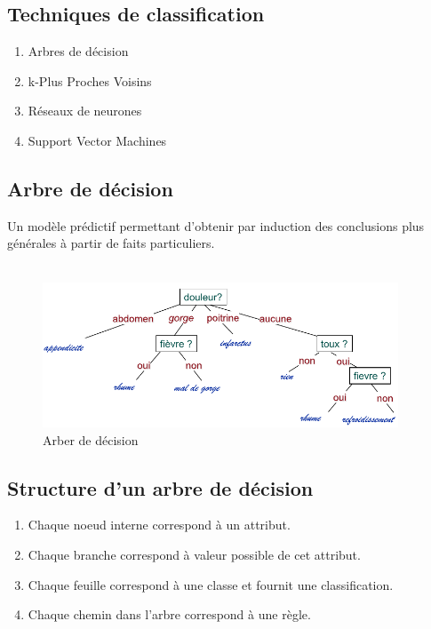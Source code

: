 \documentclass[12pt]{report}
\begin{document}
\subsection{Techniques de classification}

\begin{enumerate}
\item Arbres de décision
\item k-Plus Proches Voisins
\item Réseaux de neurones
\item Support Vector Machines
\end{enumerate}

\subsection{Arbre de décision}
Un modèle prédictif permettant d'obtenir par induction des conclusions plus générales à partir de faits particuliers.\\\\

\begin{figure}[h]
\begin{center}
\includegraphics[width=400]{add2.png}
\caption{Arber de décision}
\label{}
\end{center}


\end{figure}

\newpage
\subsection{Structure d'un arbre de décision}
\begin{enumerate}
\item Chaque noeud interne correspond à un attribut.
\item Chaque branche correspond à valeur possible de cet attribut.
\item Chaque feuille correspond à une classe et fournit une classification.
\item Chaque chemin dans l'arbre correspond à une règle.

\end{enumerate}
\end{document}
